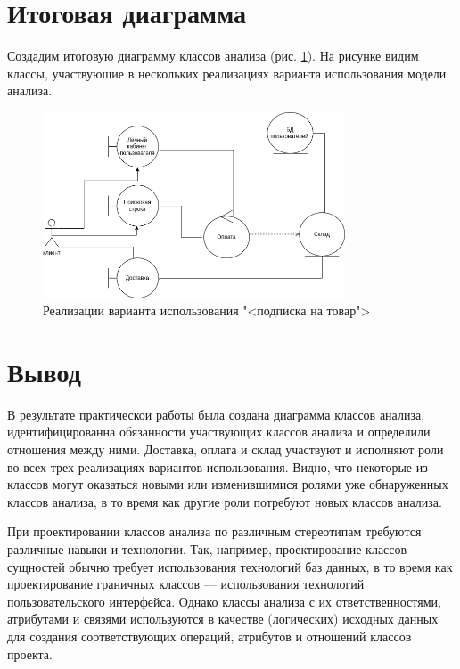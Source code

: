 \section{Итоговая диаграмма}
Создадим итоговую диаграмму классов анализа (рис. \ref{fig:complite}).
На рисунке видим классы, участвующие в нескольких реализациях варианта
использования модели анализа.
\begin{figure}[h!tp]
	\centering
	\includegraphics[width=0.8\textwidth]{uml_complite}
	\caption{Реализации варианта использования "<подписка на товар">}
	\label{fig:complite}
\end{figure}

\newpage

\section*{\LARGE Вывод}
В результате практическои работы была создана диаграмма классов анализа,
идентифицированна обязанности участвующих классов анализа и определили
отношения между ними. Доставка, оплата и склад участвуют и
исполняют роли во всех трех реализациях вариантов использования. Видно,
что некоторые из классов могут оказаться новыми или изменившимися ролями
уже обнаруженных классов анализа, в то время как другие роли потребуют
новых классов анализа.\par
При проектировании классов анализа по различным стереотипам требуются
различные навыки и технологии. Так, например, проектирование классов
сущностей обычно требует использования технологий баз данных, в то время
как проектирование граничных классов — использования технологий
пользовательского интерфейса. Однако классы анализа с их ответственностями,
атрибутами и связями используются в качестве (логических) исходных данных
для создания соответствующих операций, атрибутов и отношений классов
проекта.
